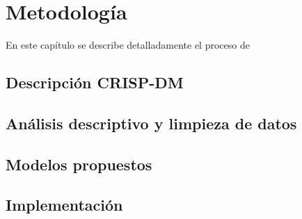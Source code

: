\chapter{Metodología}\label{chapter:methods}

En este capítulo se describe detalladamente el proceso de


\section{Descripción CRISP-DM}


\section{Análisis descriptivo y limpieza de datos}


\section{Modelos propuestos}


\section{Implementación}




